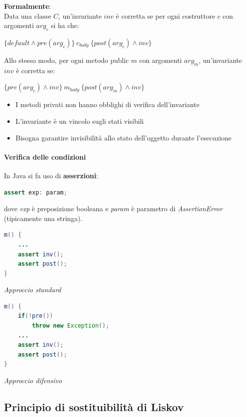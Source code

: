 \newpage

\textbf{Formalmente}:\\
Data una classe $C$, un'invariante $inv$ è corretta se per ogni costruttore $c$ con argomenti $arg_c$ si ha che:
\begin{center}
    $\{default \land pre(arg_c)\}\ c_{body}\ \{post(arg_c) \land inv\}$
\end{center}
Allo stesso modo, per ogni metodo public $m$ con argomenti $arg_m$, un'invariante $inv$ è corretta se:
\begin{center}
    $\{pre(arg_c) \land inv\}\ m_{body}\ \{post(arg_m) \land inv\}$
\end{center}
\begin{itemize}
    \item I metodi privati non hanno obblighi di verifica dell'invariante
    \item L'invariante è un vincolo sugli stati visibili
    \item Bisogna garantire invisibilità allo stato dell'oggetto durante l'esecuzione
\end{itemize}

\paragraph{Verifica delle condizioni} In Java si fa uso di \textbf{asserzioni}:
\begin{center}
    \begin{lstlisting}[language=Java]
    assert exp: param;    
    \end{lstlisting}
\end{center}
dove \textit{exp} è preposizione booleana e \textit{param} è parametro di \textit{AssertionError} (tipicamente una stringa).

\begin{multicols}{2}
\begin{lstlisting}[language=Java]
m() { 
    ...
    assert inv();
    assert post(); 
}    
\end{lstlisting}
\textit{Approccio standard}
\columnbreak
\begin{lstlisting}[language=Java]
m() {
    if(!pre())
        throw new Exception();
    ...
    assert inv(); 
    assert post(); 
}
\end{lstlisting}
\textit{Approccio difensivo}
\end{multicols}


\subsection{Principio di sostituibilità di Liskov}
\label{liskov}

